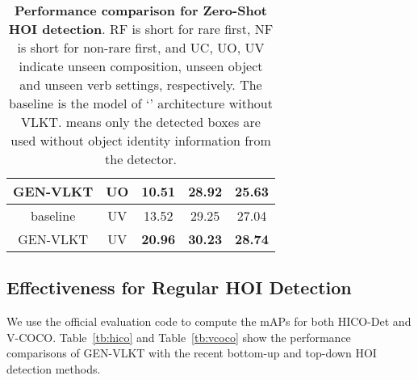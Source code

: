 \documentclass[10pt,twocolumn,letterpaper]{article}
\begin{document}
\begin{table}[t]
\begin{center}
\begin{tabular}{ccccc}
  \cellcolor{mygray-bg}GEN-VLKT			 	&\cellcolor{mygray-bg}UO			        &\cellcolor{mygray-bg}\textbf{10.51}  &\cellcolor{mygray-bg}\textbf{28.92}  &\cellcolor{mygray-bg}\textbf{25.63}\\
  \hline
  \cellcolor{mygray-bg}baseline			 	&\cellcolor{mygray-bg}UV			        &\cellcolor{mygray-bg}13.52  &\cellcolor{mygray-bg}29.25  &\cellcolor{mygray-bg}27.04\\
  \cellcolor{mygray-bg}GEN-VLKT			 	&\cellcolor{mygray-bg}UV			        &\cellcolor{mygray-bg}\textbf{20.96}  &\cellcolor{mygray-bg}\textbf{30.23}  &\cellcolor{mygray-bg}\textbf{28.74}\\
  \hline 
  \end{tabular}
  \end{center}
  \vspace{-3mm}
  \caption{\textbf{Performance comparison for Zero-Shot HOI detection}. RF is short for rare first, NF is short for non-rare first, and UC, UO, UV indicate unseen composition, unseen object and unseen verb settings, respectively. The baseline is the model of `' architecture without VLKT.  means only the detected boxes are used without object identity information from the detector.}
  \vspace{-3mm}
  \label{tb:zero-shot}
\end{table}

\vspace{-1.5mm}\subsection{Effectiveness for Regular HOI Detection}\label{sec:regular}\vspace{-1.5mm}

We use the official evaluation code to compute the mAPs for both HICO-Det and V-COCO. Table~\ref{tb:hico} and Table~\ref{tb:vcoco} show the performance comparisons of GEN-VLKT with the recent bottom-up and top-down HOI detection methods. 
\end{document}
